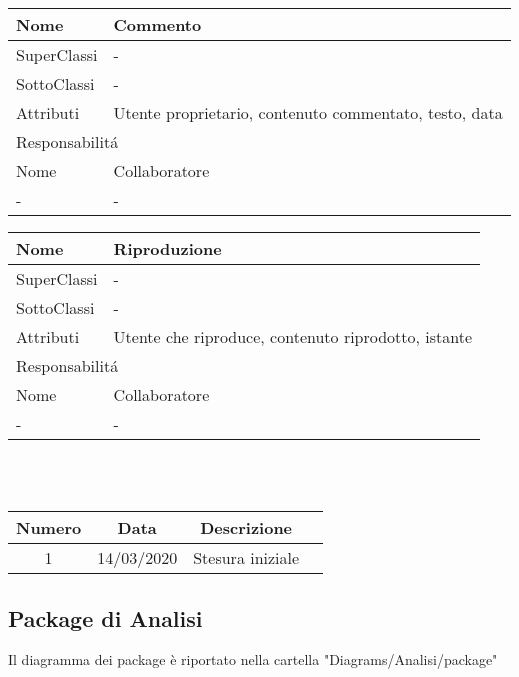 \begin{center}
    \begin{tabular}{ |p{3cm}|p{3cm}|p{3cm}|p{3cm}| }
        \hline
        Nome & \multicolumn{3}{|p{9cm}|}{Commento} \\\hline
        SuperClassi & \multicolumn{3}{|p{9cm}|}{-} \\\hline
        SottoClassi & \multicolumn{3}{|p{9cm}|}{-} \\\hline
        Attributi & \multicolumn{3}{|p{9cm}|}{Utente proprietario, contenuto commentato, testo, data} \\\hline
        \multicolumn{4}{|p{12cm}|}{Responsabilit\'a} \\\hline
        \multicolumn{2}{|p{6cm}|}{Nome} & \multicolumn{2}{|p{6cm}|}{Collaboratore} \\\hline
        \multicolumn{2}{|p{6cm}|}{-} & \multicolumn{2}{|p{6cm}|}{-} \\\hline
    \end{tabular}
\end{center}

\begin{center}
    \begin{tabular}{ |p{3cm}|p{3cm}|p{3cm}|p{3cm}| }
        \hline
        Nome & \multicolumn{3}{|p{9cm}|}{Riproduzione} \\\hline
        SuperClassi & \multicolumn{3}{|p{9cm}|}{-} \\\hline
        SottoClassi & \multicolumn{3}{|p{9cm}|}{-} \\\hline
        Attributi & \multicolumn{3}{|p{9cm}|}{Utente che riproduce, contenuto riprodotto, istante} \\\hline
        \multicolumn{4}{|p{12cm}|}{Responsabilit\'a} \\\hline
        \multicolumn{2}{|p{6cm}|}{Nome} & \multicolumn{2}{|p{6cm}|}{Collaboratore} \\\hline
        \multicolumn{2}{|p{6cm}|}{-} & \multicolumn{2}{|p{6cm}|}{-} \\\hline
    \end{tabular}
\end{center}

 \\ \\
\begin{tabular}{|c | c | c | c|} 
 	\hline
	 Numero & Data & Descrizione \\ [0.5ex] 
	\hline\hline
	1 & 14/03/2020 & Stesura iniziale \\ 
	\hline
\end{tabular}

\subsection{Package di Analisi}
Il diagramma dei package è riportato nella cartella "Diagrams/Analisi/package"
